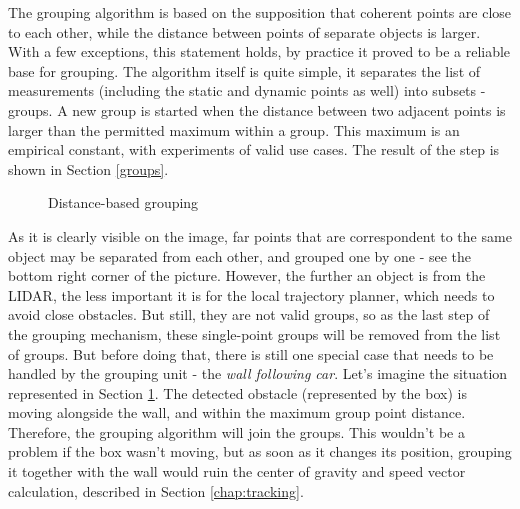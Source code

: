 The grouping algorithm is based on the supposition that coherent points are close to each other, while the distance between points of separate objects is larger. With a few exceptions, this statement holds, by practice it proved to be a reliable base for grouping. The algorithm itself is quite simple, it separates the list of measurements (including the static and dynamic points as well) into subsets - groups. A new group is started when the distance between two adjacent points is larger than the permitted maximum within a group. This maximum is an empirical constant, with experiments of valid use cases. The result of the step is shown in Section \ref{groups}.

\begin{figure}[!ht]
    \centering
    \caption{Distance-based grouping}
    \label{wall_following_car}
\end{figure}

As it is clearly visible on the image, far points that are correspondent to the same object may be separated from each other, and grouped one by one - see the bottom right corner of the picture. However, the further an object is from the LIDAR, the less important it is for the local trajectory planner, which needs to avoid close obstacles. But still, they are not valid groups, so as the last step of the grouping mechanism, these single-point groups will be removed from the list of groups. But before doing that, there is still one special case that needs to be handled by the grouping unit - the \textit{wall following car}. Let's imagine the situation represented in Section \ref{wall_following_car}. The detected obstacle (represented by the box) is moving alongside the wall, and within the maximum group point distance. Therefore, the grouping algorithm will join the groups. This wouldn't be a problem if the box wasn't moving, but as soon as it changes its position, grouping it together with the wall would ruin the center of gravity and speed vector calculation, described in Section \ref{chap:tracking}.


